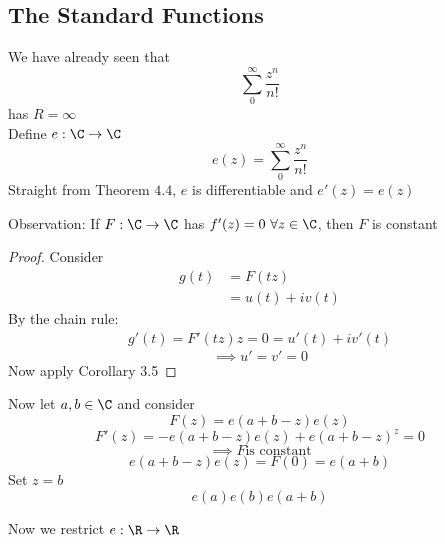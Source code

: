 \subsection{The Standard Functions}
\begin{normal}
We have already seen that
\[\sum_0^\infty\frac{z^n}{n!}\]
has $R = \infty$\\
Define $e:\C\to \C$
\[e(z) = \sum_0^\infty \frac{z^n}{n!}\]
Straight from Theorem $4.4$, $e$ is differentiable and $e'(z) = e(z)$
\begin{claim}
Observation: If $F:\C \to \C$ has $f'(z) = 0 \ \forall z\in \C$, then $F$ is constant
\end{claim}
\begin{proof}
Consider \begin{align*}
    g(t) &= F(tz)\\&= u(t) + iv(t)
\end{align*}
By the chain rule:
\begin{align*}
    g'(t) = F'(tz)z = 0 = u'(t) + iv'(t)
\end{align*}
\[\implies u' = v' = 0\]
Now apply Corollary 3.5
\end{proof}
\end{normal}
\begin{normal}
Now let $a,b\in \C$ and consider
\[F(z) = e(a+b-z)e(z)\]
\[F'(z) = -e(a+b-z)e(z) + e(a+b-z)^z = 0\]
\[\implies F \text{is constant}\]
\[e(a+b-z)e(z) = F(0) = e(a+b)\]
Set $z = b$
\[e(a)e(b) e(a+b)\]
\end{normal}
\begin{normal}
Now we restrict $e:\R\to \R$
\end{normal}
